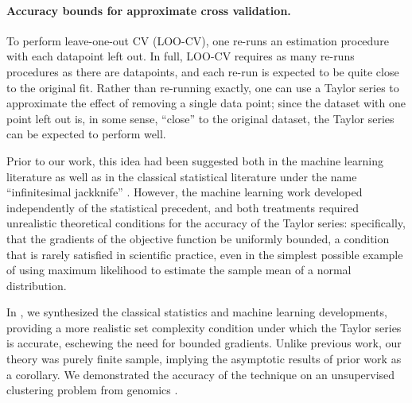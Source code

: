 
\paragraph{Accuracy bounds for approximate cross validation.}

To perform leave-one-out CV (LOO-CV), one re-runs an estimation procedure with
each datapoint left out.  In full, LOO-CV requires as many re-runs procedures as
there are datapoints, and each re-run is expected to be quite close to the
original fit.  Rather than re-running exactly, one can use a Taylor series to
approximate the effect of removing a single data point; since the dataset with
one point left out is, in some sense, ``close'' to the original dataset, the
Taylor series can be expected to perform well.

Prior to our work, this idea had been suggested both in the machine learning
literature \citep{rad:2018:scalableloo, koh:2017:blackbox} as well as in the
classical statistical literature under the name ``infinitesimal jackknife''
\citep{jaeckel:1972:infinitesimal, shao:2012:jackknife}.  However, the machine
learning work developed independently of the statistical precedent, and both
treatments required unrealistic theoretical conditions for the accuracy of the
Taylor series: specifically, that the gradients of the objective function be
uniformly bounded, a condition that is rarely satisfied in scientific practice,
even in the simplest possible example of using maximum likelihood to estimate
the sample mean of a normal distribution.

In \citet{giordano:2019:ij}, we synthesized the classical statistics and machine
learning developments, providing a more realistic set complexity condition under
which the Taylor series is accurate, eschewing the need for bounded gradients.
Unlike previous work, our theory was purely finite sample, implying the
asymptotic results of prior work as a corollary.  We demonstrated the accuracy
of the technique on an unsupervised clustering problem from genomics
\citep{shoemaker:2015:ultrasensitive}.


